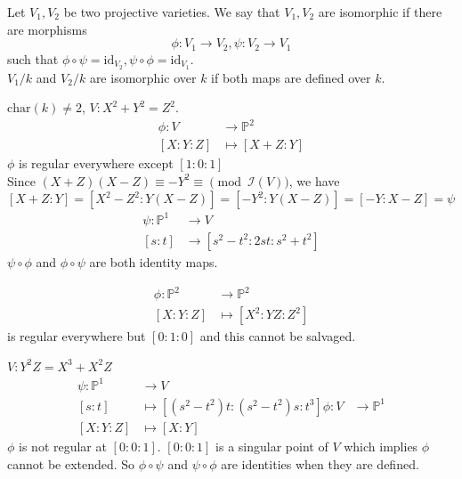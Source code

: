 \documentclass[oneside, 12pt, ]{scrbook}
\newcommand{\I}{\mathcal{I}}
\newcommand{\PP}{\mathbb{P}}
\theoremstyle{theorem}
\begin{document}
\begin{definition}
Let $V_{1},V_{2}$ be two projective varieties. We say that $V_{1},V_{2}$ are isomorphic if there are morphisms $$\phi: V_{1}\rightarrow V_{2}, \psi : V_{2} \rightarrow V_{1}$$ such that $\phi \circ \psi = \mathrm{id}_{V_{2}}, \psi \circ \phi = \mathrm{id}_{V_{1}}$. \\
$V_{1}/k$ and $V_{2}/k$ are isomorphic over $k$ if both maps are defined over $k$.
\end{definition}

\begin{example}
$\mathrm{char}(k) \neq 2$, $V: X^2 + Y^2 = Z^2$. 
\begin{align*}
\phi: V &\rightarrow \PP^2 \\
[X:Y:Z] &\mapsto [X+Z:Y]
\end{align*}
$\phi$ is regular everywhere except $[1:0:1]$\\
Since $(X+Z)(X-Z) \equiv -Y^2 \equiv \pmod{\I(V)}$, we have $[X+Z:Y] = [X^2-Z^2 : Y(X-Z)] = [-Y^2 : Y(X-Z)] = [-Y: X-Z] = \psi$ \\
\begin{align*}
\psi: \PP^1 &\rightarrow V \\
[s:t] &\rightarrow [s^2-t^2 : 2st : s^2 +t^2]
\end{align*}
$\psi\circ \phi$ and $\phi \circ \psi$ are both identity maps.
\end{example}

\begin{example}
\begin{align*}
\phi: \PP^2 &\rightarrow \PP^2 \\
[X:Y:Z] &\mapsto [X^2 : YZ : Z^2]
\end{align*}
 is regular everywhere but $[0:1:0]$ and this cannot be salvaged.
\end{example}

\begin{example}
$V: Y^2Z = X^3 + X^2 Z$
\begin{align*}
\psi: \PP^1 &\rightarrow V \\
[s:t] &\mapsto [(s^2 -t^2)t : (s^2 -t^2)s : t^3]
\phi: V &\rightarrow \PP^1 \\
[X:Y:Z] &\mapsto [X:Y]
\end{align*}
$\phi$ is not regular at $[0:0:1]$. $[0:0:1]$ is a singular point of $V$ which implies $\phi$ cannot be extended. So $\phi \circ \psi$ and $\psi \circ  \phi$ are identities  when they are defined.
\end{example}
\end{document}

